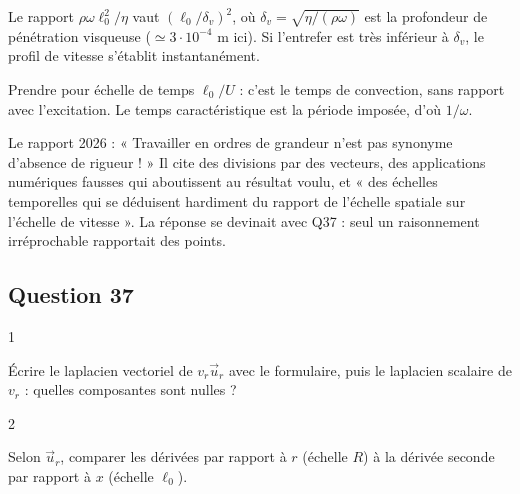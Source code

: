 \documentclass[11pt,a4paper]{article}
\begin{document}
\begin{methode}

Le rapport \(\rho\omega\ell_0^2/\eta\) vaut \((\ell_0/\delta_v)^2\), où \(\delta_v=\sqrt{\eta/(\rho\omega)}\) est la profondeur de pénétration visqueuse (\(\simeq3\cdot10^{-4}\) m ici). Si l'entrefer est très inférieur à \(\delta_v\), le profil de vitesse s'établit instantanément.

\end{methode}

\begin{piege}

Prendre pour échelle de temps \(\ell_0/U\) : c'est le temps de convection, sans rapport avec l'excitation. Le temps caractéristique est la période imposée, d'où \(1/\omega\).

\end{piege}

\begin{jury}

Le rapport 2026 : « Travailler en ordres de grandeur n'est pas synonyme d'absence de rigueur ! » Il cite des divisions par des vecteurs, des applications numériques fausses qui aboutissent au résultat voulu, et « des échelles temporelles qui se déduisent hardiment du rapport de l'échelle spatiale sur l'échelle de vitesse ». La réponse se devinait avec Q37 : seul un raisonnement irréprochable rapportait des points.

\end{jury}

\hypertarget{question-37}{%
\subsection{Question 37}\label{question-37}}

\begin{indication}{1}

Écrire le laplacien vectoriel de \(v_r\vec u_r\) avec le formulaire, puis le laplacien scalaire de \(v_r\) : quelles composantes sont nulles ?

\end{indication}

\begin{indication}{2}

Selon \(\vec u_r\), comparer les dérivées par rapport à \(r\) (échelle \(R\)) à la dérivée seconde par rapport à \(x\) (échelle \(\ell_0\)).

\end{indication}
\end{document}
